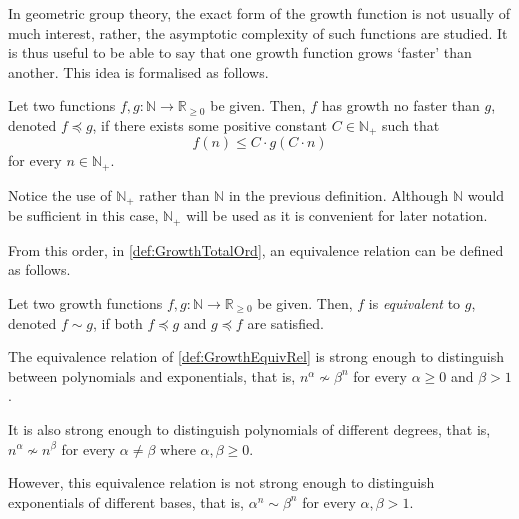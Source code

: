 In geometric group theory, the exact form of the growth function is not usually of much interest, rather, the asymptotic complexity of such functions are studied.
It is thus useful to be able to say that one growth function grows `faster' than another.
This idea is formalised as follows.

\begin{definition}
	\label{def:GrowthTotalOrd}
	Let two functions $f,g : \mathbb{N} \to \mathbb{R}_{\geq 0}$ be given.
	Then, $f$ has growth no faster than $g$, denoted $f \preccurlyeq g$, if there exists some positive constant $C \in \mathbb{N}_+$ such that \[ f(n) \leq C \cdot g\left(C \cdot n\right) \] for every $n \in \mathbb{N}_+$.
\end{definition}

\begin{remark}
	Notice the use of $\mathbb{N}_+$ rather than $\mathbb{N}$ in the previous definition.
	Although $\mathbb{N}$ would be sufficient in this case, $\mathbb{N}_+$ will be used as it is convenient for later notation.
	\thmendmark
\end{remark}

From this order, in \cref{def:GrowthTotalOrd}, an equivalence relation can be defined as follows.

\begin{definition}
	\label{def:GrowthEquivRel}
	Let two growth functions $f,g : \mathbb{N} \to \mathbb{R}_{\geq 0}$ be given.
	Then, $f$ is \emph{equivalent} to $g$, denoted $f \sim g$, if both $f \preccurlyeq g$ and $g \preccurlyeq f$ are satisfied.
\end{definition}


\begin{remark}
	\label{rmk:differentGrowthClasses}
	The equivalence relation of \cref{def:GrowthEquivRel} is strong enough to distinguish between polynomials and exponentials, that is, $n^\alpha \nsim \beta^n$ for every $\alpha \geq 0$ and $\beta > 1$.
	
	It is also strong enough to distinguish polynomials of different degrees, that is, $n^\alpha \nsim n^\beta$ for every $\alpha \neq \beta$ where $\alpha,\beta \geq 0$.
	
	However, this equivalence relation is not strong enough to distinguish exponentials of different bases, that is, $\alpha^n \sim \beta^n$ for  every $\alpha,\beta > 1$.
\end{remark}

